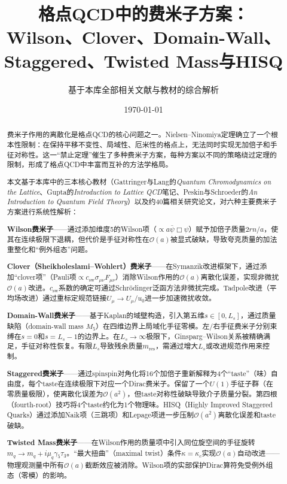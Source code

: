 \documentclass[12pt,a4paper]{ctexart}
\title{\heiti 格点QCD中的费米子方案：\\
Wilson、Clover、Domain-Wall、Staggered、Twisted Mass与HISQ}
\author{基于本库全部相关文献与教材的综合解析}
\date{\today}
\theoremstyle{definition}
\begin{document}
\maketitle

\begin{abstract}
\noindent
费米子作用的离散化是格点QCD的核心问题之一。Nielsen--Ninomiya定理确立了一个根本性限制：在保持平移不变性、局域性、厄米性的格点上，无法同时实现无加倍子和手征对称性。这一``禁止定理''催生了多种费米子方案，每种方案以不同的策略绕过定理的限制，形成了格点QCD中丰富而互补的方法学格局。

本文基于本库中的三本核心教材（Gattringer与Lang的\textit{Quantum Chromodynamics on the Lattice}、Gupta的\textit{Introduction to Lattice QCD}笔记、Peskin与Schroeder的\textit{An Introduction to Quantum Field Theory}）以及约40篇相关研究论文，对六种主要费米子方案进行系统性解析：

\textbf{Wilson费米子}——通过添加维度5的Wilson项（$\propto a\bar\psi\Box\psi$）赋予加倍子质量$2rn/a$，使其在连续极限下退耦，但代价是手征对称性在$\mathcal{O}(a)$被显式破缺，导致夸克质量的加法重整化和``例外组态''问题。

\textbf{Clover（Sheikholeslami--Wohlert）费米子}——在Symanzik改进框架下，通过添加``clover项''（Pauli项$\propto c_{\text{sw}}\sigma_{\mu\nu}F_{\mu\nu}$）消除Wilson作用的$\mathcal{O}(a)$离散化误差，实现非微扰$\mathcal{O}(a)$改进。$c_{\text{sw}}$系数的确定可通过Schr\"odinger泛函方法非微扰完成。Tadpole改进（平均场改进）通过重标定规范链接$U_\mu \to U_\mu/u_0$进一步加速微扰收敛。

\textbf{Domain-Wall费米子}——基于Kaplan的域壁构造，引入第五维$s\in[0,L_s]$，通过质量缺陷（domain-wall mass $M_5$）在四维边界上局域化手征零模。左/右手征费米子分别束缚在$s=0$和$s=L_s-1$的边界上。在$L_s\to\infty$极限下，Ginsparg--Wilson关系被精确满足，手征对称性恢复。有限$L_s$导致残余质量$m_{\text{res}}$，需通过增大$L_s$或改进规范作用来控制。

\textbf{Staggered费米子}——通过spinspin对角化将16个加倍子重新解释为4个``taste''（味）自由度，每个taste在连续极限下对应一个Dirac费米子。保留了一个$U(1)$手征子群（在零质量极限），使离散化误差为$\mathcal{O}(a^2)$，但taste对称性破缺导致介子质量分裂。第四根（fourth-root）技巧将4个taste约化为1个物理味。HISQ（Highly Improved Staggered Quarks）通过添加Naik项（三跳项）和Lepage项进一步压制$\mathcal{O}(a^2)$离散化误差和taste破缺。

\textbf{Twisted Mass费米子}——在Wilson作用的质量项中引入同位旋空间的手征旋转$m_q \to m_q + i\mu_q\gamma_5\tau_3$。``最大扭曲''（maximal twist）条件$\kappa = \kappa_c$实现$\mathcal{O}(a)$自动改进——物理观测量中所有$\mathcal{O}(a)$截断效应被消除。Wilson项的实部保护Dirac算符免受例外组态（零模）的影响。


\end{abstract}
\end{document}
